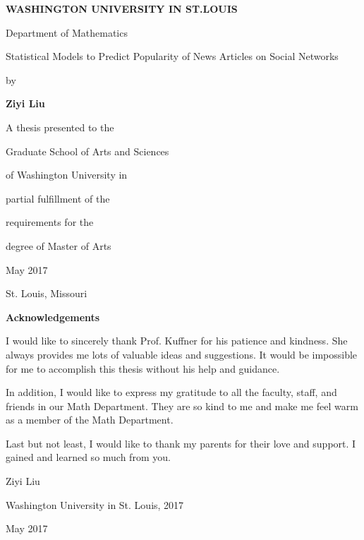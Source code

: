 \documentclass[12pt]{article}
\begin{document}
\thispagestyle{empty}
\vspace*{1\baselineskip}
\centerline{\bf{WASHINGTON UNIVERSITY IN ST.LOUIS}}
\vspace*{1\baselineskip}
\centerline{Department of Mathematics}
\vspace*{8\baselineskip}
\centerline{Statistical Models to Predict Popularity of News Articles on Social Networks}
\vspace*{2\baselineskip}
\centerline{by}
\vspace*{1\baselineskip}
\centerline{\bf{Ziyi Liu}}
\vspace*{12\baselineskip}
\centerline{A thesis presented to the}
\centerline{Graduate School of Arts and Sciences} 
\centerline{of Washington University in}
\centerline{partial fulfillment of the}
\centerline{requirements for the}
\centerline{degree of Master of Arts}
\vspace*{4\baselineskip}
\centerline{May 2017}
\vspace*{1\baselineskip}
\centerline{St. Louis, Missouri}
\clearpage

\doublespacing

\setcounter{page}{2}
\tableofcontents
\newpage

\listoffigures
\newpage

\listoftables
\clearpage

\vspace*{1\baselineskip}
\centerline{\bf{Acknowledgements}}
\vspace*{4\baselineskip}
I would like to sincerely thank Prof. Kuffner for his patience and kindness. She always provides me lots of valuable ideas and suggestions. It would be impossible for me to accomplish this thesis without his help and guidance.
\vspace*{1\baselineskip}

In addition, I would like to express my gratitude to all the faculty, staff, and friends in our Math Department. They are so kind to me and make me feel warm as a member of the Math Department.
\vspace*{1\baselineskip}

Last but not least, I would like to thank my parents for their love and support. I gained and learned so much from you.

\vspace*{4\baselineskip}
\centerline{Ziyi Liu}
\centerline{Washington University in St. Louis, 2017}
\centerline{May 2017}
\end{document}
